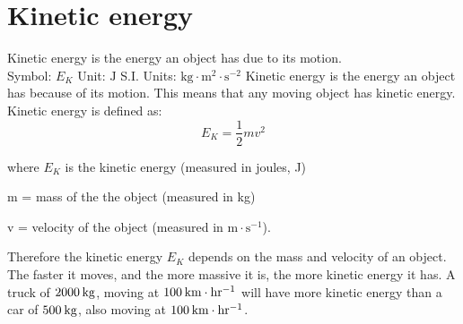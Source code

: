          \section{Kinetic energy}
    \nopagebreak
{} {Kinetic energy is the energy an object has due to its motion.\\
 Symbol: $E_{K}$ \hspace{2cm} Unit: $\text{J}$\hspace{2cm} S.I. Units: $\text{kg} \cdot \text{m}^{2} \cdot \text{s}^{-2}$} 
      \label{m38785*id66796}Kinetic energy is the energy an object has because of its motion. This means that any moving object has kinetic energy. Kinetic energy is defined as:
    \begin{equation*}
    \boxed{{E}_{K}=\frac{1}{2}m{v}^{2}}
      \end{equation*}

where $E_{K}$ is the kinetic energy (measured in joules, J) \par
m = mass of the the object (measured in kg) \par
v = velocity of the object (measured in $\text{m} \cdot \text{s}^{-1}$). \par

Therefore the kinetic energy $E_{K}$ depends on the mass and velocity of an object. 
The faster it moves, and the more massive it is, the more kinetic energy it has. 
A truck of $2 000\phantom{\rule{2pt}{0ex}}\text{kg}$, moving at $100\phantom{\rule{2pt}{0ex}}\text{km}\ensuremath{\cdot}\text{hr}{}^{-1}$ will have more kinetic energy than a car of $500\phantom{\rule{2pt}{0ex}}\text{kg}$, also moving at $100\phantom{\rule{2pt}{0ex}}\text{km}\ensuremath{\cdot}\text{hr}{}^{-1}$. 
      \label{m38785*eip-368}
      \label{m38785*uid62}\nopagebreak\noindent{}

